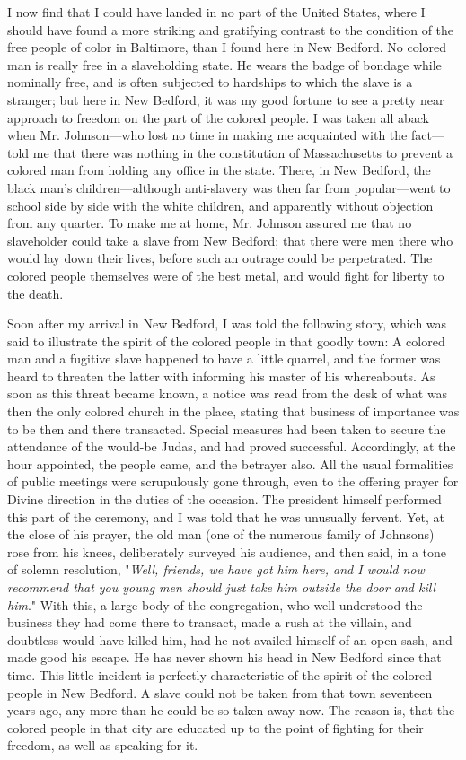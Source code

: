 I now find that I could have landed in no part of the United States,
where I should have found a more striking and gratifying contrast to the
condition of the free people of color in Baltimore, than I found here in
New Bedford. No colored man is really free in a slaveholding state. He
wears the badge of bondage while nominally free, and is often subjected
to hardships to which the slave is a stranger; but here in New Bedford,
it was my good fortune to see a pretty near approach to freedom on the
part of the {}colored people. I was taken all aback when Mr.
Johnson---who lost no time in making me acquainted with the fact---told
me that there was nothing in the constitution of Massachusetts to
prevent a colored man from holding any office in the state. There, in
New Bedford, the black man's children---although anti-slavery was then
far from popular---went to school side by side with the white children,
and apparently without objection from any quarter. To make me at home,
Mr. Johnson assured me that no slaveholder could take a slave from New
Bedford; that there were men there who would lay down their lives,
before such an outrage could be perpetrated. The colored people
themselves were of the best metal, and would fight for liberty to the
death.

Soon after my arrival in New Bedford, I was told the following story,
which was said to illustrate the spirit of the colored people in that
goodly town: A colored man and a fugitive slave happened to have a
little quarrel, and the former was heard to threaten the latter with
informing his master of his whereabouts. As soon as this threat became
known, a notice was read from the desk of what was then the only colored
church in the place, stating that business of importance was to be then
and there transacted. Special measures had been taken to secure the
attendance of the would-be Judas, and had proved successful.
Accordingly, at the hour appointed, the people came, and the betrayer
also. All the usual formalities of public meetings were scrupulously
gone through, even to the offering prayer for Divine direction in the
duties of the occasion. The president {}himself performed this part of
the ceremony, and I was told that he was unusually fervent. Yet, at the
close of his prayer, the old man (one of the numerous family of
Johnsons) rose from his knees, deliberately surveyed his audience, and
then said, in a tone of solemn resolution, "\emph{Well, friends, we have
got him here, and I would now recommend that you young men should just
take him outside the door and kill him}." With this, a large body of the
congregation, who well understood the business they had come there to
transact, made a rush at the villain, and doubtless would have killed
him, had he not availed himself of an open sash, and made good his
escape. He has never shown his head in New Bedford since that time. This
little incident is perfectly characteristic of the spirit of the colored
people in New Bedford. A slave could not be taken from that town
seventeen years ago, any more than he could be so taken away now. The
reason is, that the colored people in that city are educated up to the
point of fighting for their freedom, as well as speaking for it.

